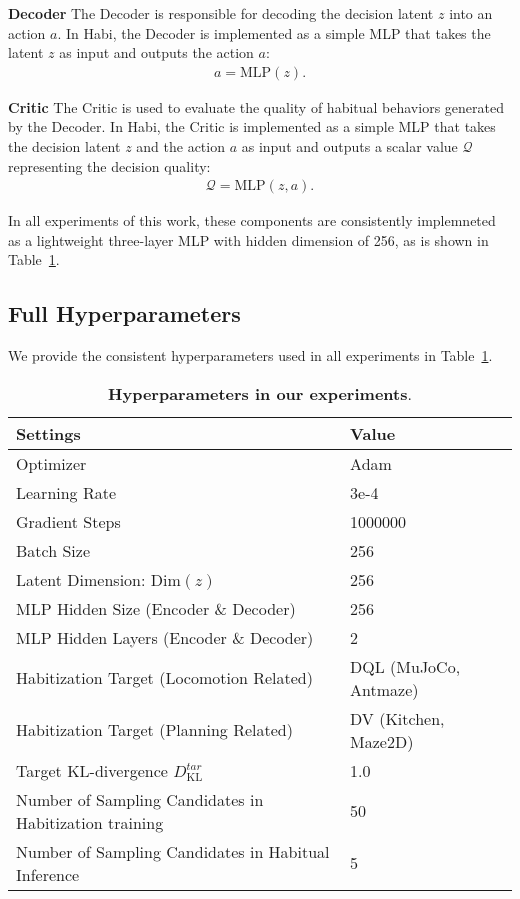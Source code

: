 \textbf{Decoder} \; The Decoder is responsible for decoding the decision latent \( z \) into an action \( a \). In Habi, the Decoder is implemented as a simple MLP that takes the latent \( z \) as input and outputs the action \( a \):
\begin{align}
a = \mathrm{MLP}(z).
\end{align}

\textbf{Critic} \; The Critic is used to evaluate the quality of habitual behaviors generated by the Decoder. In Habi, the Critic is implemented as a simple MLP that takes the decision latent \( z \) and the action \( a \) as input and outputs a scalar value $\mathcal{Q}$ representing the decision quality:
\begin{align}
\mathcal{Q} = \mathrm{MLP}(z, a).
\end{align}

In all experiments of this work, these components are consistently implemneted as a lightweight three-layer MLP with hidden dimension of 256, as is shown in Table~\ref{tab:hyperparam}.

\subsection{Full Hyperparameters}
We provide the consistent hyperparameters used in all experiments in Table~\ref{tab:hyperparam}.


\begin{table}[ht] 
\tabcolsep=20pt
\centering
\caption{\textbf{Hyperparameters in our experiments}.}
\begin{tabular}{ll} 
\toprule
\textbf{Settings} & \textbf{Value} \\ 
\midrule
Optimizer & Adam \\
Learning Rate & 3e-4 \\
Gradient Steps & 1000000 \\
Batch Size & 256 \\
Latent Dimension: $\mathrm{Dim}(z)$ & 256 \\
MLP Hidden Size (Encoder \& Decoder) & 256 \\
MLP Hidden Layers (Encoder \& Decoder) & 2 \\
Habitization Target (Locomotion Related) & DQL \citep{wang2023diffusion} (MuJoCo, Antmaze) \\
Habitization Target (Planning Related) & DV \citep{lu2025what} (Kitchen, Maze2D) \\
Target KL-divergence $D_\mathrm{KL}^{tar}$ & 1.0 \\
Number of Sampling Candidates in Habitization training & 50 \\
Number of Sampling Candidates in Habitual Inference & 5 \\
\bottomrule
\end{tabular}
\label{tab:hyperparam}
\end{table}


